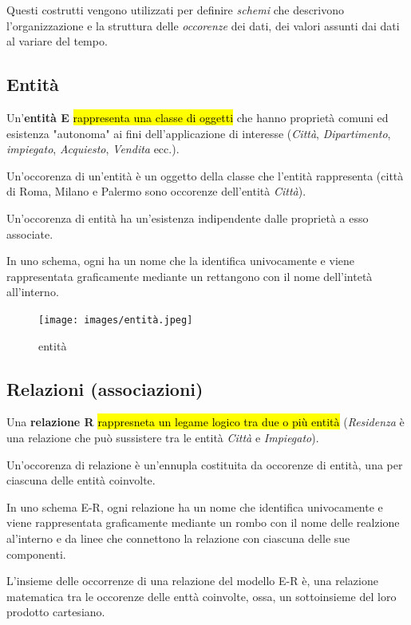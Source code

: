 \documentclass[a4paper, 12pt]{book}
\begin{document}
    Questi costrutti vengono utilizzati per definire \textit{schemi} che descrivono l'organizzazione e la struttura delle \textit{occorenze} dei dati, dei valori assunti dai dati al variare del tempo.

    \subsection*{Entità}
    Un'\textbf{entità E} \hl{rappresenta una classe di oggetti} che hanno proprietà comuni ed esistenza "autonoma" ai fini dell'applicazione di interesse (\textit{Città}, \textit{Dipartimento}, \textit{impiegato}, \textit{Acquiesto}, \textit{Vendita} ecc.).

    Un'occorenza di un'entità è un oggetto della classe che l'entità rappresenta (città di Roma, Milano e Palermo sono occorenze dell'entità \textit{Città}).

    Un'occorenza di entità ha un'esistenza indipendente dalle proprietà a esso associate.

    In uno schema, ogni ha un nome che la identifica univocamente e viene rappresentata graficamente mediante un rettangono con il nome dell'intetà all'interno.

    \begin{figure}[H]
      \centering
      \texttt{[image: images/entità.jpeg]}
      \caption{entità}
    \end{figure}

    \subsection*{Relazioni (associazioni)}
    Una \textbf{relazione R} \hl{rappresneta un legame logico tra due o più entità} (\textit{Residenza} è una relazione che può sussistere tra le entità \textit{Città} e \textit{Impiegato}).

    Un'occorenza di relazione è un'ennupla costituita da occorenze di entità, una per ciascuna delle entità coinvolte.

    In uno schema E-R, ogni relazione ha un nome che identifica univocamente e viene rappresentata graficamente mediante un rombo con il nome delle realzione al'interno e da linee che connettono la relazione con ciascuna delle sue componenti.

    L'insieme delle occorrenze di una relazione del modello E-R è, una relazione matematica tra le occorenze delle enttà coinvolte, ossa, un sottoinsieme del loro prodotto cartesiano.
\end{document}
